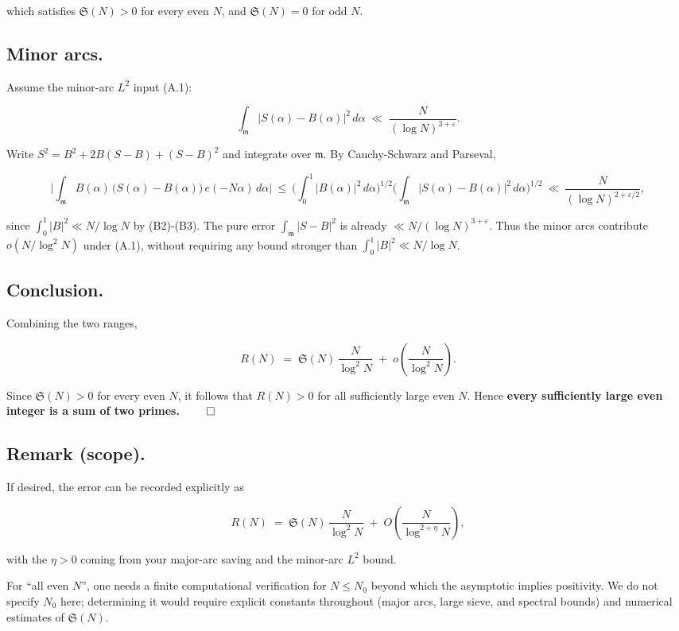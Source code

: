\documentclass[11pt]{article}
\theoremstyle{definition}
\theoremstyle{remark}
\begin{document}
which satisfies $\mathfrak S(N)>0$ for every even $N$, and $\mathfrak S(N)=0$ for odd $N$.

\subsection*{Minor arcs.}

Assume the minor-arc $L^2$ input (A.1):

$$
	\int_{\mathfrak m} |S(\alpha)-B(\alpha)|^2\,d\alpha
	\;\ll\;\frac{N}{(\log N)^{3+\varepsilon}}.
$$

Write $S^2=B^2+2B(S-B)+(S-B)^2$ and integrate over $\mathfrak m$.
By Cauchy-Schwarz and Parseval,

$$
	\Big|\int_{\mathfrak m} B(\alpha)\,\big(S(\alpha)-B(\alpha)\big)\,e(-N\alpha)\,d\alpha\Big|
	\ \le\ \Big(\int_0^1 |B(\alpha)|^2\,d\alpha\Big)^{1/2}
	\Big(\int_{\mathfrak m}|S(\alpha)-B(\alpha)|^2\,d\alpha\Big)^{1/2}
	\ \ll\ \frac{N}{(\log N)^{2+\varepsilon/2}},
$$

since $\int_0^1|B|^2\ll N/\log N$ by (B2)-(B3). The pure error $\int_{\mathfrak m}|S-B|^2$ is already $\ll N/(\log N)^{3+\varepsilon}$. Thus the minor arcs contribute $o\!\left(N/\log^2 N\right)$ under (A.1), without requiring any bound stronger than $\int_0^1|B|^2\ll N/\log N$.

\subsection*{Conclusion.}

Combining the two ranges,

$$
	R(N)
	\;=\;\mathfrak S(N)\,\frac{N}{\log^2 N}\;+\;o\!\left(\frac{N}{\log^2 N}\right).
$$

Since $\mathfrak S(N)>0$ for every even $N$, it follows that $R(N)>0$ for all sufficiently large even $N$. Hence \textbf{every sufficiently large even integer is a sum of two primes.} $\qed$

\subsection*{Remark (scope).}
If desired, the error can be recorded explicitly as

$$
	R(N)\;=\;\mathfrak S(N)\,\frac{N}{\log^2 N}\;+\;O\!\left(\frac{N}{\log^{2+\eta}N}\right),
$$

with the $\eta>0$ coming from your major-arc saving and the minor-arc $L^2$ bound.

For “all even $N$”, one needs a finite computational verification for $N\le N_0$ beyond which the asymptotic implies positivity. We do not specify $N_0$ here; determining it would require explicit constants throughout (major arcs, large sieve, and spectral bounds) and numerical estimates of $\mathfrak S(N)$.
\end{document}
